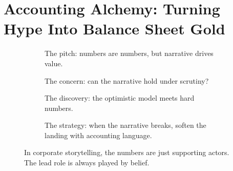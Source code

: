 \section{Accounting Alchemy: Turning Hype Into Balance Sheet Gold}

\begin{figure}[H]
    \centering
  
    \begin{subfigure}[t]{0.45\textwidth}
    \centering
    \caption*{The pitch: numbers are numbers, but narrative drives value.}
    \end{subfigure}
    \hfill
    \begin{subfigure}[t]{0.45\textwidth}
    \centering
    \caption*{The concern: can the narrative hold under scrutiny?}
    \end{subfigure}
  
    \vspace{1em}
  
    \begin{subfigure}[t]{0.45\textwidth}
    \centering
    \caption*{The discovery: the optimistic model meets hard numbers.}
    \end{subfigure}
    \hfill
    \begin{subfigure}[t]{0.45\textwidth}
    \centering
    \caption*{The strategy: when the narrative breaks, soften the landing with accounting language.}
    \end{subfigure}
  
    \caption*{In corporate storytelling, the numbers are just supporting actors. The lead role is always played by belief.}
  \end{figure}



